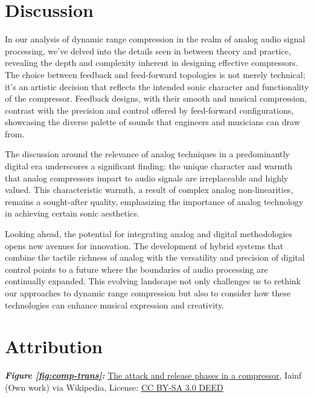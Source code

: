 \documentclass[10pt]{article}
\begin{document}
\begin{multicols*}{2}
        \section*{Discussion}
            In our analysis of dynamic range compression in the realm of analog audio signal processing, we've delved into the details seen in between theory and practice, revealing the depth and complexity inherent in designing effective compressors. The choice between feedback and feed-forward topologies is not merely technical; it's an artistic decision that reflects the intended sonic character and functionality of the compressor. Feedback designs, with their smooth and musical compression, contrast with the precision and control offered by feed-forward configurations, showcasing the diverse palette of sounds that engineers and musicians can draw from.\par
            The discussion around the relevance of analog techniques in a predominantly digital era underscores a significant finding: the unique character and warmth that analog compressors impart to audio signals are irreplaceable and highly valued. This characteristic warmth, a result of complex analog non-linearities, remains a sought-after quality, emphasizing the importance of analog technology in achieving certain sonic aesthetics.\par 
            Looking ahead, the potential for integrating analog and digital methodologies opens new avenues for innovation. The development of hybrid systems that combine the tactile richness of analog with the versatility and precision of digital control points to a future where the boundaries of audio processing are continually expanded. This evolving landscape not only challenges us to rethink our approaches to dynamic range compression but also to consider how these technologies can enhance musical expression and creativity.

        \section*{Attribution}
            \footnotesize{
                \textit{\textbf{Figure \ref{fig:comp-trans}:}} \href{https://en.wikipedia.org/wiki/Dynamic_range_compression#/media/File:Audio_Compression_Attack_and_Release-2.svg}{The attack and release phases in a compressor}, Iainf (Own work) via Wikipedia, License: \href{https://creativecommons.org/licenses/by-sa/3.0/}{CC BY-SA 3.0 DEED}\\

}
\end{multicols*}
\end{document}
